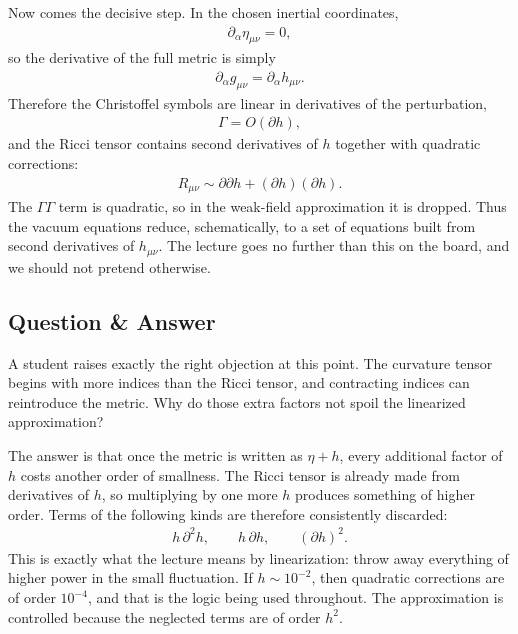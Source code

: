 Now comes the decisive step. In the chosen inertial coordinates,
\begin{align}
\partial_{\alpha}\eta_{\mu\nu}=0,
\end{align}
so the derivative of the full metric is simply
\begin{align}
\partial_{\alpha}g_{\mu\nu}=\partial_{\alpha}h_{\mu\nu}.
\end{align}
Therefore the Christoffel symbols are linear in derivatives of the perturbation,
\begin{align}
\Gamma = O(\partial h),
\end{align}
and the Ricci tensor contains second derivatives of \(h\) together with quadratic corrections:
\begin{align}
R_{\mu\nu}\sim \partial\partial h+(\partial h)(\partial h).
\end{align}
The \(\Gamma\Gamma\) term is quadratic, so in the weak-field approximation it is dropped. Thus the vacuum equations reduce, schematically, to a set of equations built from second derivatives of \(h_{\mu\nu}\). The lecture goes no further than this on the board, and we should not pretend otherwise.

\subsection{Question \& Answer}

A student raises exactly the right objection at this point. The curvature tensor begins with more indices than the Ricci tensor, and contracting indices can reintroduce the metric. Why do those extra factors not spoil the linearized approximation?

The answer is that once the metric is written as \(\eta+h\), every additional factor of \(h\) costs another order of smallness. The Ricci tensor is already made from derivatives of \(h\), so multiplying by one more \(h\) produces something of higher order. Terms of the following kinds are therefore consistently discarded:
\begin{align}
h\,\partial^2 h,
\qquad
h\,\partial h,
\qquad
(\partial h)^2.
\end{align}
This is exactly what the lecture means by linearization: throw away everything of higher power in the small fluctuation. If \(h\sim 10^{-2}\), then quadratic corrections are of order \(10^{-4}\), and that is the logic being used throughout. The approximation is controlled because the neglected terms are of order \(h^2\).

